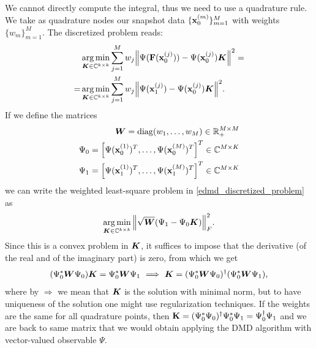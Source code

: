 We cannot directly compute the integral, thus we need to use a quadrature rule. We take as quadrature nodes our snapshot data $\{\vb{x}_0^{(m)}\}_{m = 1}^M$ with weights $\{w_m\}_{m = 1}^M$. The discretized problem reads:
\begin{equation}
\label{edmd_discretized_problem}
\begin{split}
    &\operatorname*{arg\,min}_{\vb*{K}\in\mathbb{C}^{k\times k}} \sum_{j=1}^M w_j \norm{\Psi(\vb{F}(\vb{x}_0^{(j)})) - \Psi(\vb{x}_0^{(j)})\vb*{K}}^2 = \\
    = &\operatorname*{arg\,min}_{\vb*{K}\in\mathbb{C}^{k\times k}} \sum_{j=1}^M w_j \norm{\Psi(\vb{x}_1^{(j)}) - \Psi(\vb{x}_0^{(j)})\vb*{K}}^2.
\end{split}    
\end{equation}
If we define the matrices
\begin{align}
\label{w_def}
\vb*{W} = \mathrm{diag}(w_1,\dots,w_M)\in\mathbb{R}_+^{M\times M} \\
\label{psi0_def}
\Psi_0 = \left[\Psi(\vb{x}_0^{(1)})^T,\dots,\Psi(\vb{x}_0^{(M)})^T\right]^T\in\mathbb{C}^{M\times K} \\
\label{psi1_def}
\Psi_1 = \left[\Psi(\vb{x}_1^{(1)})^T,\dots,\Psi(\vb{x}_1^{(M)})^T\right]^T\in\mathbb{C}^{M\times K}
\end{align}
we can write the weighted least-square problem in \eqref{edmd_discretized_problem} as 
\begin{equation}
    \label{edmd_discretized_problem_matrix}
    \operatorname*{arg\,min}_{\vb*{K}\in\mathbb{C}^{k\times k}}\norm{\sqrt{\vb*{W}}(\Psi_1 - \Psi_0\vb*{K})}_F^2.
\end{equation}
Since this is a convex problem in $\vb*{K}$, it suffices to impose that the derivative (of the real and of the imaginary part) is zero, from which we get
\begin{equation}
    \label{discretized_problem_solution}
    (\Psi_0^*\vb*{W}\Psi_0)\vb*{K} = \Psi_0^*\vb*{W}\Psi_1 \,\,\Longrightarrow\,\, \vb*{K} = (\Psi_0^*\vb*{W}\Psi_0)^{\dagger}(\Psi_0^*\vb*{W}\Psi_1),
\end{equation}
where by $\Longrightarrow$ we mean that $\vb*{K}$ is the solution with minimal norm, but to have uniqueness of the solution one might use regularization techniques. If the weights are the same for all quadrature points, then $\vb{K} = (\Psi_0^*\Psi_0)^{\dagger} \Psi_0^*\Psi_1 = \Psi_0^{\dagger}\Psi_1$ and we are back to same matrix that we would obtain applying the DMD algorithm with vector-valued observable $\Psi$.

